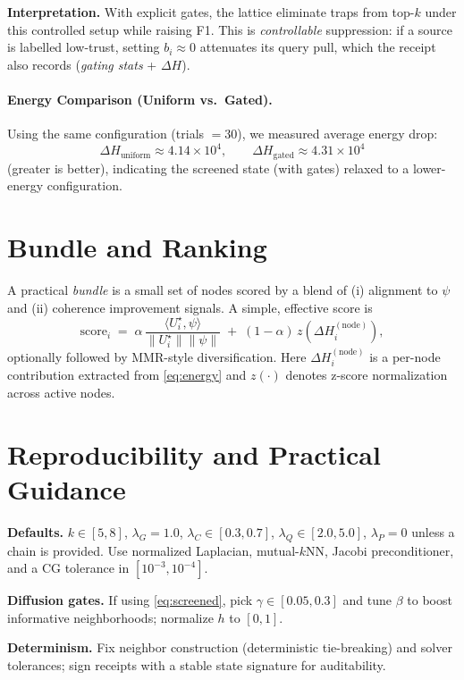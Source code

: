 \documentclass[11pt]{article}
\begin{document}
\noindent
\textbf{Interpretation.} With explicit gates, the lattice eliminate traps from top-$k$ under this controlled setup while raising F1. This is \emph{controllable} suppression: if a source is labelled low-trust, setting $b_i\!\approx 0$ attenuates its query pull, which the receipt also records (\emph{gating stats} + $\Delta H$).

\paragraph{Energy Comparison (Uniform vs.\ Gated).}
Using the same configuration (trials $=30$), we measured average energy drop:
\[
\Delta H_{\text{uniform}} \approx 4.14{\times}10^4,
\qquad
\Delta H_{\text{gated}} \approx 4.31{\times}10^4
\]
(greater is better), indicating the screened state (with gates) relaxed to a lower-energy configuration.

\vspace{-0.5em}
\section{Bundle and Ranking}
A practical \emph{bundle} is a small set of nodes scored by a blend of (i) alignment to $\psi$ and (ii) coherence improvement signals. A simple, effective score is
\[
\mathrm{score}_i \;=\; \alpha\, \frac{\langle U^\star_i, \psi\rangle}{\|U^\star_i\|\|\psi\|} \;+\;
(1-\alpha)\, z\!\left(\Delta H^{(\text{node})}_i\right),
\]
optionally followed by MMR-style diversification. Here $\Delta H^{(\text{node})}_i$ is a per-node contribution extracted from \eqref{eq:energy} and $z(\cdot)$ denotes z-score normalization across active nodes.

\vspace{-0.5em}
\section{Reproducibility and Practical Guidance}
\textbf{Defaults.} $k\!\in\![5,8]$, $\lambda_G\!=\!1.0$, $\lambda_C\!\in\![0.3,0.7]$, $\lambda_Q\!\in\![2.0,5.0]$, $\lambda_P\!=\!0$ unless a chain is provided. Use normalized Laplacian, mutual-$k$NN, Jacobi preconditioner, and a CG tolerance in $[10^{-3},10^{-4}]$.

\textbf{Diffusion gates.} If using \eqref{eq:screened}, pick $\gamma\!\in[0.05,0.3]$ and tune $\beta$ to boost informative neighborhoods; normalize $h$ to $[0,1]$.

\textbf{Determinism.} Fix neighbor construction (deterministic tie-breaking) and solver tolerances; sign receipts with a stable state signature for auditability.
\end{document}
